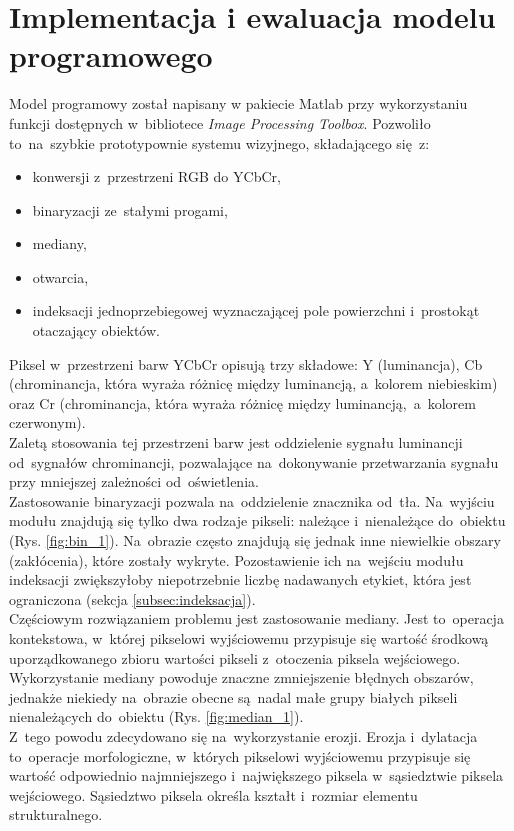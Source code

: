 \section{Implementacja i ewaluacja modelu programowego}
\label{sec:implementacja_modelu_programowego}
Model programowy został napisany w pakiecie Matlab przy wykorzystaniu funkcji dostępnych w~bibliotece \textit{Image Processing Toolbox}. 
Pozwoliło to~na~szybkie prototypownie systemu wizyjnego, składającego się~z:
\begin{itemize}
	\item konwersji z~przestrzeni RGB do YCbCr,
	\item binaryzacji ze~stałymi progami,
	\item mediany,
	\item otwarcia,
	\item indeksacji jednoprzebiegowej wyznaczającej pole powierzchni i~prostokąt otaczający obiektów.
\end{itemize}
Piksel w~przestrzeni barw YCbCr opisują trzy składowe: Y (luminancja), Cb (chrominancja, która wyraża różnicę między luminancją, a~kolorem niebieskim) oraz Cr (chrominancja, która wyraża różnicę między luminancją,~a~kolorem czerwonym). \\
Zaletą stosowania tej przestrzeni barw jest oddzielenie sygnału luminancji od~sygnałów chrominancji, pozwalające na~dokonywanie przetwarzania sygnału przy mniejszej zależności od~oświetlenia.\\
Zastosowanie binaryzacji pozwala na~oddzielenie znacznika od~tła. Na~wyjściu modułu znajdują się tylko dwa rodzaje pikseli: należące i~nienależące do~obiektu (Rys. \ref{fig:bin_1}).
Na~obrazie często znajdują się jednak inne niewielkie obszary (zakłócenia), które zostały wykryte. Pozostawienie ich na~wejściu modułu indeksacji zwiększyłoby niepotrzebnie liczbę nadawanych etykiet, która jest ograniczona (sekcja \ref{subsec:indeksacja}).\\
Częściowym rozwiązaniem problemu jest zastosowanie mediany. Jest to~operacja kontekstowa, w~której pikselowi wyjściowemu przypisuje się wartość środkową uporządkowanego zbioru wartości pikseli z~otoczenia piksela wejściowego. \\
Wykorzystanie mediany powoduje znaczne zmniejszenie błędnych obszarów, jednakże niekiedy na~obrazie obecne są~nadal małe grupy białych pikseli nienależących do~obiektu (Rys. \ref{fig:median_1}).\\
Z~tego powodu zdecydowano się na~wykorzystanie erozji. Erozja i~dylatacja to~operacje morfologiczne, w~których pikselowi wyjściowemu przypisuje się wartość odpowiednio najmniejszego i~największego piksela w~sąsiedztwie piksela wejściowego. Sąsiedztwo piksela określa kształt i~rozmiar elementu strukturalnego.  
